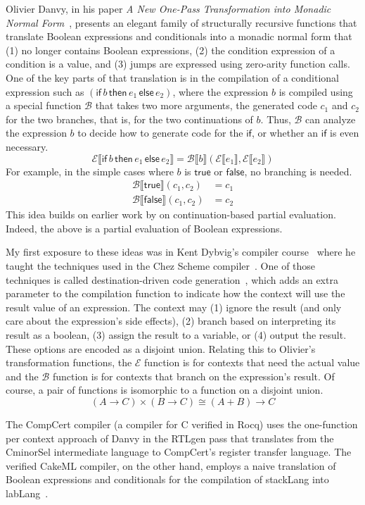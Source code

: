 \documentclass[sigplan,screen]{acmart}
\newcommand{\TRUE}[0]{\mathsf{true}}
\newcommand{\FALSE}[0]{\mathsf{false}}
\newcommand{\IF}[3]{\mathsf{if}\,#1\,\mathsf{then}\,#2\,\mathsf{else}\,#3}
\newcommand{\CE}[1]{\mathcal{E} \llbracket #1 \rrbracket}
\newcommand{\CB}[3]{\mathcal{B} \llbracket #1 \rrbracket ( #2, #3 )}
\begin{document}
Olivier Danvy, in his paper \emph{A New One-Pass Transformation into
Monadic Normal Form}~\citep{Danvy:2003fk}, presents an elegant family
of structurally recursive functions that translate Boolean expressions
and conditionals into a monadic normal form that (1) no longer
contains Boolean expressions, (2) the condition expression of a
condition is a value, and (3) jumps are expressed using zero-arity
function calls. One of the key parts of that translation is in the
compilation of a conditional expression such as $(\IF{b}{e_1}{e_2})$,
where the expression $b$ is compiled using a special function
$\mathcal{B}$ that takes two more arguments, the generated code $c_1$
and $c_2$ for the two branches, that is, for the two continuations of
$b$.  Thus, $\mathcal{B}$ can analyze the expression $b$ to decide how
to generate code for the $\mathsf{if}$, or whether an $\mathsf{if}$ is
even necessary.
\[
\CE{\IF{b}{e_1}{e_2}} = \CB{b}{\CE{e_1}}{\CE{e_2}}
\]
For example, in the simple cases where $b$ is $\TRUE$ or $\FALSE$,
no branching is needed.
\begin{align*}
\CB{\TRUE}{c_1}{c_2} &= c_1 \\
\CB{\FALSE}{c_1}{c_2} &= c_2
\end{align*}
\noindent This idea builds on earlier work by \citet{Lawall:1994aa} on
continuation-based partial evaluation. Indeed, the above is a partial
evaluation of Boolean expressions.

My first exposure to these ideas was in Kent Dybvig's compiler
course~\citep{Dybvig:2010aa} where he taught the techniques used in
the Chez Scheme compiler~\citep{Dybvig:2006aa}.  One of those
techniques is called destination-driven code
generation~\citep{Dybvig:1990aa}, which adds an extra parameter to the
compilation function to indicate how the context will use the result
value of an expression. The context may (1) ignore the result (and
only care about the expression's side effects), (2) branch based on
interpreting its result as a boolean, (3) assign the result to a
variable, or (4) output the result. These options are encoded as a
disjoint union.  Relating this to Olivier's transformation functions,
the $\mathcal{E}$ function is for contexts that need the actual value
and the $\mathcal{B}$ function is for contexts that branch on the
expression's result. Of course, a pair of functions is isomorphic to a
function on a disjoint union.
\[
(A → C) × (B → C) ≅ (A + B) → C
\]

The CompCert compiler \citep{Leroy:2006fe} (a compiler for C verified
in Rocq) uses the one-function per context approach of Danvy in the
RTLgen pass that translates from the CminorSel intermediate language
to CompCert's register transfer language. The verified CakeML
compiler, on the other hand, employs a naive translation of Boolean
expressions and conditionals for the compilation of stackLang into
labLang~\citep{Kumar:2014aa}.
\end{document}
